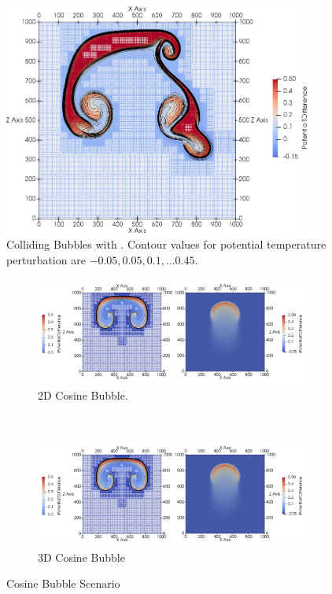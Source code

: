 \documentclass[runningheads]{llncs}
\begin{document}
\begin{figure}[tb]
  \centering
  \includegraphics[width=0.90\textwidth]{paper_two_bubbles}
  \caption{\label{fig:two-bubbles-ader}Colliding Bubbles with \aderdg{}. Contour values for potential temperature perturbation are $-0.05, 0.05, 0.1, \ldots 0.45$.}
\end{figure}

\begin{figure}[tb]
  \centering
  \begin{subfigure}[t]{0.5\textwidth}
    \centering
    \includegraphics[width=\textwidth, trim={0cm 0 23cm 0},clip]{paper_cosine_bubble_collage}
    \caption{\label{fig:cosine-2d}2D Cosine Bubble.}%
  \end{subfigure}~%
  \begin{subfigure}[t]{0.5\textwidth}
    \centering
    \includegraphics[width=\textwidth, trim={23cm 0 0cm 0},clip]{paper_cosine_bubble_collage}
    \caption{\label{fig:cosine-3d}3D Cosine Bubble}
  \end{subfigure}
  \caption{\label{fig:cosine-bubbles-results}Cosine Bubble Scenario}
\end{figure}
\end{document}
